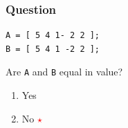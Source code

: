 \documentclass[11pt]{beamer}
\newcommand{\correctstar}{{\Large\textcolor{red}{$\star$}}}
\begin{document}
\begin{frame}[fragile]
  \frametitle{Question}
  \Enlarge

  \begin{Verbatim}
A = [ 5 4 1- 2 2 ];
B = [ 5 4 1 -2 2 ];
  \end{Verbatim}

Are \texttt{A} and \texttt{B} equal in value?

  \begin{enumerate}[label=\Alph*]
    \item  Yes
    \item  No  \correctstar
  \end{enumerate}
\end{frame}

\end{document}
